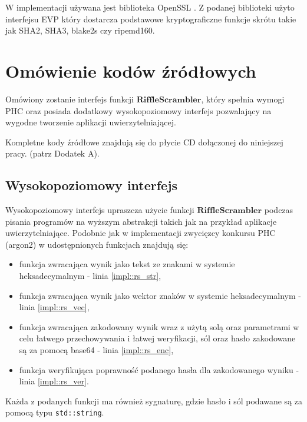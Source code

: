 W implementacji używana jest biblioteka OpenSSL \cite{openssl}.
Z podanej biblioteki użyto interfejsu EVP \cite{opensslevp} który dostarcza podstawowe kryptograficzne funkcje skrótu takie jak SHA2, SHA3, blake2s czy ripemd160.


\section{Omówienie kodów źródłowych}
Omówiony zostanie interfejs funkcji $\mathbf{RiffleScrambler}$, który spełnia wymogi PHC oraz posiada dodatkowy wysokopoziomowy interfejs pozwalający na wygodne tworzenie aplikacji uwierzytelniającej.

Kompletne kody źródłowe znajdują się do płycie CD dołączonej do niniejszej pracy. (patrz Dodatek A).

\subsection{Wysokopoziomowy interfejs}
Wysokopoziomowy interfejs upraszcza użycie funkcji $\mathbf{RiffleScrambler}$ podczas pisania
programów na wyższym abstrakcji takich jak na przykład aplikacje uwierzytelniające.
Podobnie jak w implementacji zwycięzcy konkursu PHC (argon2) w udostępnionych funkcjach znajdują się:
\begin{itemize}
	\item funkcja zwracająca wynik jako tekst ze znakami w systemie heksadecymalnym - linia \ref{impl::rs_str},
	\item funkcja zwracająca wynik jako wektor znaków w systemie heksadecymalnym - linia \ref{impl::rs_vec},
	\item funkcja zwracająca zakodowany wynik wraz z użytą solą oraz parametrami w celu łatwego przechowywania i łatwej weryfikacji, sól oraz hasło zakodowane są za pomocą base64 \cite{josefsson2006base16} - linia \ref{impl::rs_enc},
	\item funkcja weryfikująca poprawność podanego hasła dla zakodowanego wyniku - linia \ref{impl::rs_ver}.
\end{itemize}

Każda z podanych funkcji ma również sygnaturę, gdzie hasło i sól podawane są za pomocą typu \texttt{std::string}.

